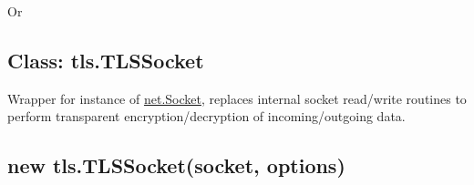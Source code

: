 Or

\begin{Shaded}
\begin{Highlighting}[]
 \NormalTok{(}\NormalTok{);}
 \NormalTok{(}\NormalTok{);}

 
  \NormalTok{: }\NormalTok{(}\NormalTok{)}
\NormalTok{\};}

 \NormalTok{(}\NormalTok{() \{}
  \NormalTok{(}\NormalTok{,}
                \NormalTok{: }\NormalTok{);}
  \NormalTok{();}
\NormalTok{\});}
\NormalTok{(}\NormalTok{);}
\NormalTok{(}\NormalTok{, }
\NormalTok{\});}
\NormalTok{(}\NormalTok{, }\NormalTok{() \{}
  \NormalTok{();}
\NormalTok{\});}
\end{Highlighting}
\end{Shaded}

\subsection{Class: tls.TLSSocket}\label{class-tls.tlssocket}

Wrapper for instance of
\href{net.html\#net_class_net_socket}{net.Socket}, replaces internal
socket read/write routines to perform transparent encryption/decryption
of incoming/outgoing data.

\subsection{new tls.TLSSocket(socket,
options)}\label{new-tls.tlssocketsocket-options}


